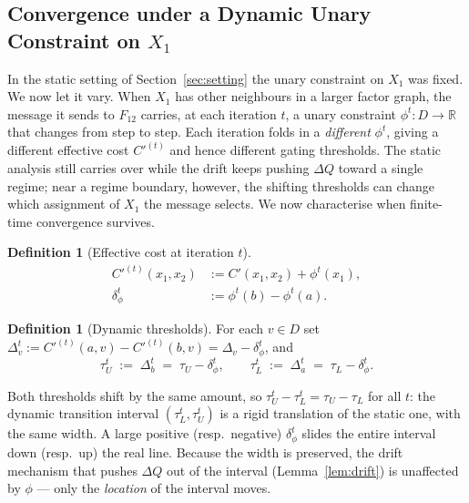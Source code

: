 \documentclass[letterpaper]{article} %
\theoremstyle{definition}
\newtheorem{definition}[theorem]{Definition}
\theoremstyle{remark}
\begin{document}
\subsection{Convergence under a Dynamic Unary Constraint on $X_1$}\label{sec:dynamic}
In the static setting of Section~\ref{sec:setting} the unary constraint on $X_1$ was fixed.  We now let it vary.  When $X_1$ has other neighbours in a larger factor graph, the message it sends to $F_{12}$ carries, at each iteration $t$, a unary constraint $\phi^t : D \to \mathbb{R}$ that changes from step to step.
Each iteration folds in a \emph{different} $\phi^t$, giving a different effective cost $C'^{(t)}$ and hence different gating thresholds.  The static analysis still carries over while the drift keeps pushing $\Delta Q$ toward a single regime; near a regime boundary, however, the shifting thresholds can change which assignment of $X_1$ the message selects.  We now characterise when finite-time convergence survives.
\begin{definition}[Effective cost at iteration $t$]\label{def:dynC}
\[
    \begin{aligned}
        C'^{(t)}(x_1, x_2) &:= C'(x_1, x_2) + \phi^t(x_1), \\
        \delta^t_\phi &:= \phi^t(b) - \phi^t(a).
    \end{aligned}
\]
\end{definition}
\begin{definition}[Dynamic thresholds]\label{def:dynthresh}
For each $v \in D$ set $\Delta^t_v := C'^{(t)}(a,v) - C'^{(t)}(b,v) = \Delta_v - \delta^t_\phi$, and
\[
    \tau_U^t \;:=\; \Delta^t_b \;=\; \tau_U - \delta^t_\phi,
    \qquad
    \tau_L^t \;:=\; \Delta^t_a \;=\; \tau_L - \delta^t_\phi.
\]
\end{definition}
\noindent Both thresholds shift by the same amount, so $\tau_U^t - \tau_L^t = \tau_U - \tau_L$ for all $t$: the dynamic transition interval $(\tau_L^t, \tau_U^t)$ is a rigid translation of the static one, with the same width.  A large positive (resp.\ negative) $\delta^t_\phi$ slides the entire interval down (resp.\ up) the real line.  Because the width is preserved, the drift mechanism that pushes $\Delta Q$ out of the interval (Lemma~\ref{lem:drift}) is unaffected by $\phi$ --- only the \emph{location} of the interval moves.
\end{document}
